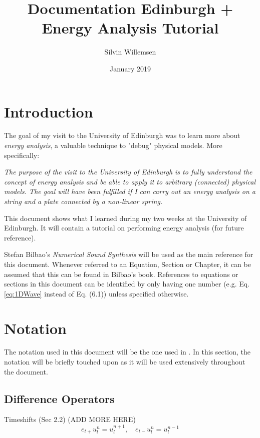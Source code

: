 \documentclass{article}
\title{Documentation Edinburgh + Energy Analysis Tutorial}
\author{Silvin Willemsen}
\date{January 2019}
\begin{document}
\maketitle

\section{Introduction}\label{sec:introduction}
The goal of my visit to the University of Edinburgh was to learn more about \textit{energy analysis}, a valuable technique to "debug" physical models. More specifically:

\begin{center}
    \textit{The purpose of the visit to the University of Edinburgh is to fully understand the concept of energy analysis and be able to apply it to arbitrary (connected) physical models. The goal will have been fulfilled if I can carry out an energy analysis on a string and a plate connected by a non-linear spring.}
\end{center}

This document shows what I learned during my two weeks at the University of Edinburgh. It will contain a tutorial on performing energy analysis (for future reference). 

Stefan Bilbao's \textit{Numerical Sound Synthesis} \cite{Bilbao2009} will be used as the main reference for this document. Whenever referred to an Equation, Section or Chapter, it can be assumed that this can be found in Bilbao's book. References to equations or sections in this document can be identified by only having one number (e.g. Eq. \eqref{eq:1DWave} instead of Eq. (6.1)) unless specified otherwise.


\section{Notation}\label{sec:notation} 
The notation used in this document will be the one used in \cite{Bilbao2009}. In this section, the notation will be briefly touched upon as it will be used extensively throughout the document.

\subsection{Difference Operators} 
Timeshifts (Sec 2.2) (ADD MORE HERE)
\begin{equation}
    e_{t+}u_l^n = u_l^{n+1}, \quad e_{t-}u_l^n = u_l^{n-1}
\end{equation}
\end{document}
